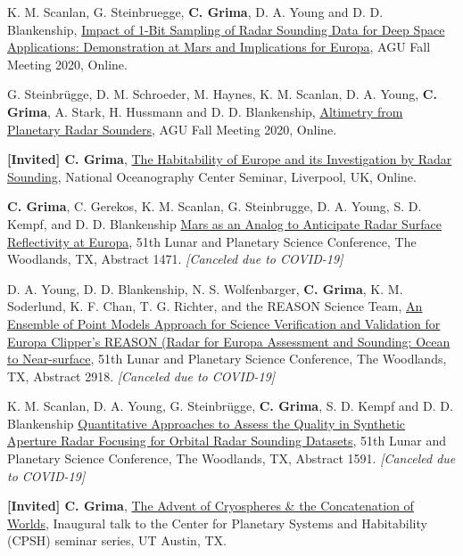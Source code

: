 \begin{etaremune}
\item
  K. M. Scanlan, G. Steinbruegge, \textbf{C. Grima}, D. A. Young and D. D. Blankenship, \href{https://agu.confex.com/agu/fm20/webprogram/Paper742180.html}{Impact of 1-Bit Sampling of Radar Sounding Data for Deep Space Applications: Demonstration at Mars and Implications for Europa}, AGU Fall Meeting 2020, Online.
\item
  G. Steinbrügge, D. M. Schroeder, M. Haynes, K. M. Scanlan, D. A. Young, \textbf{C. Grima}, A. Stark, H. Hussmann and D. D. Blankenship, \href{https://agu.confex.com/agu/fm20/webprogram/Paper672813.html}{Altimetry from Planetary Radar Sounders}, AGU Fall Meeting 2020, Online.
\item
  \textbf{{[}Invited{]} C. Grima}, \href{https://noc.ac.uk/seminars/liverpool/habitability-europe-its-investigation-radar-sounding}{The Habitability of Europe and its Investigation by Radar Sounding}, National Oceanography Center Seminar, Liverpool, UK, Online.
\item
  \textbf{C. Grima}, C. Gerekos,  K. M. Scanlan,  G. Steinbrugge, D. A. Young, S. D. Kempf, and D. D. Blankenship \href{https://www.hou.usra.edu/meetings/lpsc2020/pdf/1471.pdf}{Mars as an Analog to Anticipate Radar Surface Reflectivity at Europa}, 51th Lunar and Planetary Science Conference, The Woodlands, TX, Abstract 1471. \emph{[Canceled due to COVID-19]}
\item
  D. A. Young, D. D. Blankenship, N. S. Wolfenbarger, \textbf{C. Grima}, K. M. Soderlund, K. F. Chan, T. G. Richter, and the REASON Science Team, \href{https://www.hou.usra.edu/meetings/lpsc2020/pdf/2918.pdf}{An Ensemble of Point Models Approach for Science Verification and Validation for Europa Clipper's REASON (Radar for Europa Assessment and Sounding: Ocean to Near-surface}, 51th Lunar and Planetary Science Conference, The Woodlands, TX, Abstract 2918. \emph{[Canceled due to COVID-19]}
\item
  K. M. Scanlan, D. A. Young, G. Steinbrügge, \textbf{C. Grima},  S.  D.  Kempf and  D. D. Blankenship \href{https://www.hou.usra.edu/meetings/lpsc2020/pdf/1591.pdf}{Quantitative Approaches to Assess the Quality in Synthetic Aperture Radar Focusing for Orbital Radar Sounding Datasets}, 51th Lunar and Planetary Science Conference, The Woodlands, TX, Abstract 1591. \emph{[Canceled due to COVID-19]}
\item
  \textbf{{[}Invited{]} C. Grima}, \href{https://}{The Advent of Cryospheres \& the Concatenation of Worlds}, Inaugural talk to the Center for Planetary Systems and Habitability (CPSH) seminar series, UT Austin, TX.


\end{etaremune}
